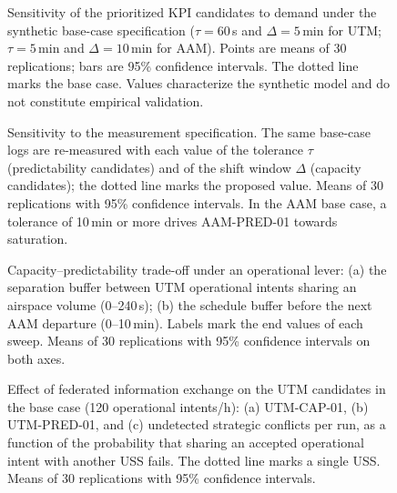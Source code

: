 %   

\begin{figure}[!t]
\centering

\caption{Sensitivity of the prioritized KPI candidates to demand under the synthetic base-case
specification ($\tau = 60$\,s and $\Delta = 5$\,min for UTM; $\tau = 5$\,min and $\Delta = 10$\,min
for AAM). Points are means of 30 replications; bars are 95\% confidence intervals. The dotted line marks
the base case. Values characterize the synthetic model and do not constitute empirical validation.}
\label{fig:e2a}
\end{figure}

\begin{figure}[!t]
\centering

\caption{Sensitivity to the measurement specification. The same base-case logs are re-measured with each
value of the tolerance $\tau$ (predictability candidates) and of the shift window $\Delta$ (capacity
candidates); the dotted line marks the proposed value. Means of 30 replications with 95\% confidence
intervals. In the AAM base case, a tolerance of 10\,min or more drives AAM-PRED-01 towards saturation.}
\label{fig:e2b}
\end{figure}

\begin{figure}[!t]
\centering

\caption{Capacity--predictability trade-off under an operational lever: (a) the separation buffer between
UTM operational intents sharing an airspace volume (0--240\,s); (b) the schedule buffer before the next AAM
departure (0--10\,min). Labels mark the end values of each sweep. Means of 30 replications with 95\%
confidence intervals on both axes.}
\label{fig:e4}
\end{figure}

\begin{figure}[!t]
\centering

\caption{Effect of federated information exchange on the UTM candidates in the base case (120 operational
intents/h): (a) UTM-CAP-01, (b) UTM-PRED-01, and (c) undetected strategic conflicts per run, as a function
of the probability that sharing an accepted operational intent with another USS fails. The dotted line
marks a single USS. Means of 30 replications with 95\% confidence intervals.}
\label{fig:e5}
\end{figure}
